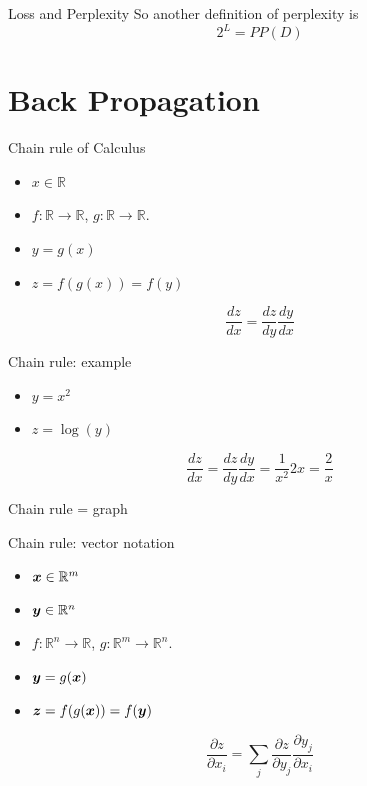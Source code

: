 \documentclass[10pt]{beamer}
\begin{document}
\begin{frame}{Loss and Perplexity}
So another definition of perplexity is
\vspace{0.5cm}
\Large{
\begin{equation*}
2^{L} = PP(D)
\end{equation*}
}
\end{frame}

\section{Back Propagation}

\begin{frame}{Chain rule of Calculus}
\Large{
\begin{itemize}
\item $x \in \mathbb{R}$
\item $f:\mathbb{R} \rightarrow\mathbb{R}$, $g:\mathbb{R} \rightarrow\mathbb{R}$. 
\item $y = g(x)$
\item $z = f(g(x)) = f(y)$
\end{itemize}

\[
\frac{dz}{dx} = \frac{dz}{dy} \frac{dy}{dx} 
\]
}
\end{frame}

\begin{frame}{Chain rule: example}
\Large{
\begin{itemize}
\item $y = x^2$
\item $z = \log(y)$
\end{itemize}
\[
\frac{dz}{dx} = \frac{dz}{dy} \frac{dy}{dx} = \frac{1}{x^2}2x = \frac{2}{x}
\]
}
\end{frame}

\begin{frame}{Chain rule = graph}

\end{frame}

\begin{frame}{Chain rule: vector notation}
\Large{
\begin{itemize}
\item $\bm{x} \in \mathbb{R}^{m}$
\item $\bm{y} \in \mathbb{R}^{n}$
\item $f:\mathbb{R}^{n} \rightarrow\mathbb{R}$, $g:\mathbb{R}^{m} \rightarrow\mathbb{R}^{n}$. 
\item $\bm{y} = g(\bm{x})$
\item $\bm{z} = f(g(\bm{x})) = f(\bm{y})$
\end{itemize}
\[
\frac{\partial z}{\partial x_{i}} =\sum_{j} \frac{\partial z}{\partial y_{j}} \frac{\partial y_{j}}{\partial x_{i}} 
\]
}
\end{frame}
\end{document}
